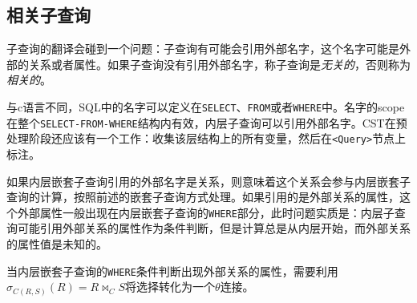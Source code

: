 \subsection{相关子查询}

子查询的翻译会碰到一个问题：子查询有可能会引用外部名字，这个名字可能是外部的关系或者属性。如果子查询没有引用外部名字，称子查询是\emph{无关的}，否则称为\emph{相关的}。

与c语言不同，SQL中的名字可以定义在\texttt{SELECT}、\texttt{FROM}或者\texttt{WHERE}中。名字的scope在整个\texttt{SELECT-FROM-WHERE}结构内有效，内层子查询可以引用外部名字。CST在预处理阶段还应该有一个工作：收集该层结构上的所有变量，然后在\texttt{<Query>}节点上标注。

如果内层嵌套子查询引用的外部名字是关系，则意味着这个关系会参与内层嵌套子查询的计算，按照前述的嵌套子查询方式处理。如果引用的是外部关系的属性，这个外部属性一般出现在内层嵌套子查询的\texttt{WHERE}部分，此时问题实质是：内层子查询可能引用外部关系的属性作为条件判断，但是计算总是从内层开始，而外部关系的属性值是未知的。

当内层嵌套子查询的\texttt{WHERE}条件判断出现外部关系的属性，需要利用$\sigma_{C(R,S)}(R) = R \bowtie_{C} S$将选择转化为一个$\theta$连接。

